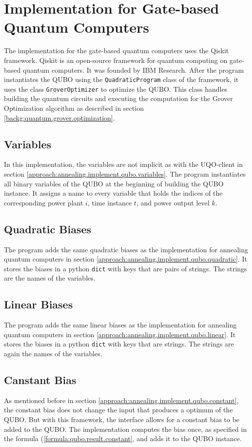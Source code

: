 \section{Implementation for Gate-based Quantum Computers}

The implementation for the gate-based quantum computers uses the Qiskit framework.
Qiskit is an open-source framework for quantum computing on gate-based quantum computers.
It was founded by IBM Research.
\cite{QiskitWeb, QiskitGitHub}
After the program instantiates the QUBO using the \texttt{QuadraticProgram} class of the framework, it uses the class \texttt{GroverOptimizer} to optimize the QUBO.
This class handles building the quantum circuits and executing the computation for the Grover Optimization algorithm as described in section \ref{backg:quantum.grover.optimization}.

\subsection{Variables}

In this implementation, the variables are not implicit as with the UQO-client in section \ref{approach:annealing.implement.qubo.variables}.
The program instantiates all binary variables of the QUBO at the beginning of building the QUBO instance.
It assigns a name to every variable that holds the indices of the corresponding power plant $i$, time instance $t$, and power output level $k$.

\subsection{Quadratic Biases}

The program adds the same quadratic biases as the implementation for annealing quantum computers in section \ref{approach:annealing.implement.qubo.quadratic}.
It stores the biases in a python \texttt{dict} with keys that are pairs of strings.
The strings are the names of the variables.

\subsection{Linear Biases}

The program adds the same linear biases as the implementation for annealing quantum computers in section \ref{approach:annealing.implement.qubo.linear}.
It stores the biases in a python \texttt{dict} with keys that are strings.
The strings are again the names of the variables.

\subsection{Canstant Bias}

As mentioned before in section \ref{approach:annealing.implement.qubo.constant}, the constant bias does not change the input that produces a optimum of the QUBO.
But with this framework, the interface allows for a constant bias to be added to the QUBO.
The implementation computes the bias once, as specified in the formula (\ref{formula:qubo.result.constant}, and adds it to the QUBO instance.
